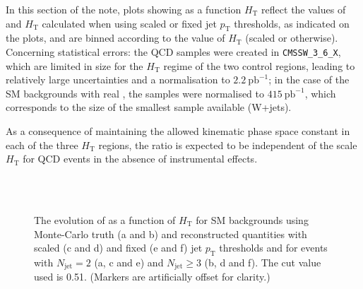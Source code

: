 In this section of the note, plots showing \RaT as a function
$H_{\mathrm{T}}$ reflect the values of \RaT and $H_{\mathrm{T}}$
calculated when using scaled or fixed jet $p_{\mathrm{T}}$ thresholds,
as indicated on the plots, and are binned according to the value of
$H_{\mathrm{T}}$ (scaled or otherwise). Concerning statistical errors:
the QCD samples were created in \nolinkurl{CMSSW_3_6_X}, which are
limited in size for the $H_{\mathrm{T}}$ regime of the two control
regions, leading to relatively large uncertainties and a normalisation
to $2.2~\mathrm{pb}^{-1}$; in the case of the SM backgrounds with real
\mymet, the samples were normalised to $415~\mathrm{pb}^{-1}$, which
corresponds to the size of the smallest sample available (W+jets).

As a consequence of maintaining the allowed kinematic phase space
constant in each of the three $H_{\mathrm{T}}$ regions, the ratio \RaT
is expected to be independent of the scale $H_{\mathrm{T}}$ for QCD
events in the absence of instrumental effects.

\begin{figure}[!h]
  \begin{center} 
     \\
     \\
    \caption{\label{fig:ratio_vs_ht_051} The evolution of \RaT as a
      function of $H_{\mathrm{T}}$ for SM backgrounds using
      Monte-Carlo truth (a and b) and reconstructed quantities with
      scaled (c and d) and fixed (e and f) jet $p_{\mathrm{T}}$
      thresholds and for events with $N_{\mathrm{jet}} = 2$ (a, c and
      e) and $N_{\mathrm{jet}} \geq 3$ (b, d and f). The \aT cut value
      used is 0.51. (Markers are artificially offset for clarity.)}
  \end{center}
\end{figure}

